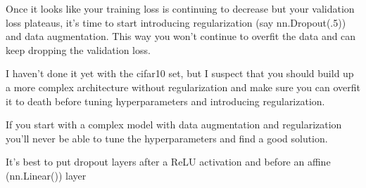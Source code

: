 Once it looks like your training loss is continuing to decrease but your validation loss plateaus, it’s time to start introducing regularization (say nn.Dropout(.5)) and data augmentation. This way you won’t continue to overfit the data and can keep dropping the validation loss.

I haven’t done it yet with the cifar10 set, but I suspect that you should build up a more complex architecture without regularization and make sure you can overfit it to death before tuning hyperparameters and introducing regularization.

If you start with a complex model with data augmentation and regularization you’ll never be able to tune the hyperparameters and find a good solution.

It’s best to put dropout layers after a ReLU activation and before an affine (nn.Linear()) layer






